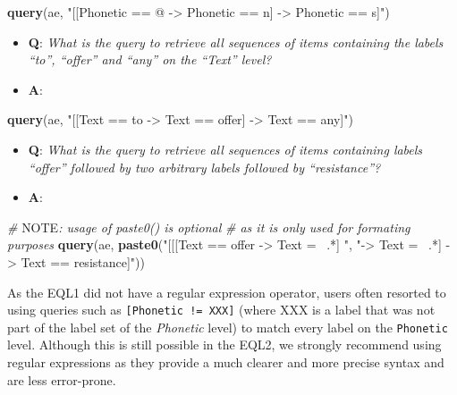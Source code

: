 \documentclass[]{book}
\newenvironment{Shaded}{\begin{snugshade}}{\end{snugshade}}
\newcommand{\AlertTok}[1]{\textcolor[rgb]{0.94,0.16,0.16}{#1}}
\newcommand{\CommentTok}[1]{\textcolor[rgb]{0.56,0.35,0.01}{\textit{#1}}}
\newcommand{\KeywordTok}[1]{\textcolor[rgb]{0.13,0.29,0.53}{\textbf{#1}}}
\newcommand{\NormalTok}[1]{#1}
\newcommand{\StringTok}[1]{\textcolor[rgb]{0.31,0.60,0.02}{#1}}
\providecommand{\tightlist}{%
  \setlength{\itemsep}{0pt}\setlength{\parskip}{0pt}}
\begin{document}
\begin{Shaded}
\begin{Highlighting}[]
\KeywordTok{query}\NormalTok{(ae, }\StringTok{"[[Phonetic == @ -> Phonetic == n] -> Phonetic == s]"}\NormalTok{)}
\end{Highlighting}
\end{Shaded}

\begin{itemize}
\tightlist
\item
  \textbf{Q}: \emph{What is the query to retrieve all sequences of items containing the labels ``to'', ``offer'' and ``any'' on the ``Text'' level?}
\item
  \textbf{A}:
\end{itemize}

\begin{Shaded}
\begin{Highlighting}[]
\KeywordTok{query}\NormalTok{(ae, }\StringTok{"[[Text == to -> Text == offer] -> Text == any]"}\NormalTok{)}
\end{Highlighting}
\end{Shaded}

\begin{itemize}
\tightlist
\item
  \textbf{Q}: \emph{What is the query to retrieve all sequences of items containing labels ``offer'' followed by two arbitrary labels followed by ``resistance''?}
\item
  \textbf{A}:
\end{itemize}

\begin{Shaded}
\begin{Highlighting}[]
\CommentTok{# }\AlertTok{NOTE}\CommentTok{: usage of paste0() is optional}
\CommentTok{# as it is only used for formating purposes}
\KeywordTok{query}\NormalTok{(ae, }\KeywordTok{paste0}\NormalTok{(}\StringTok{"[[[Text == offer -> Text =~ .*] "}\NormalTok{,}
                 \StringTok{"-> Text =~ .*] -> Text == resistance]"}\NormalTok{))}
\end{Highlighting}
\end{Shaded}

As the EQL1 did not have a regular expression operator, users often resorted to using queries such as \texttt{{[}Phonetic\ !=\ XXX{]}} (where XXX is a label that was not part of the label set of the \emph{Phonetic} level) to match every label on the \texttt{Phonetic} level. Although this is still possible in the EQL2, we strongly recommend using regular expressions as they provide a much clearer and more precise syntax and are less error-prone.
\end{document}
